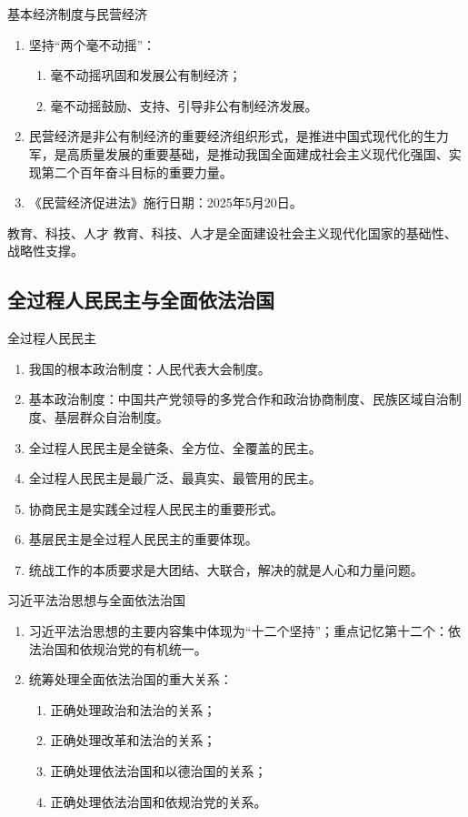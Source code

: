 \documentclass[12pt,a4paper]{ctexart}
\begin{document}
\begin{yellowbox}{基本经济制度与民营经济}
\begin{enumerate}
  \item 坚持“两个毫不动摇”：
  \begin{enumerate}
    \item 毫不动摇巩固和发展公有制经济；
    \item 毫不动摇鼓励、支持、引导非公有制经济发展。
  \end{enumerate}
  \item 民营经济是非公有制经济的重要经济组织形式，是推进中国式现代化的生力军，是高质量发展的重要基础，是推动我国全面建成社会主义现代化强国、实现第二个百年奋斗目标的重要力量。
  \item 《民营经济促进法》施行日期：2025年5月20日。
\end{enumerate}
\end{yellowbox}

\begin{yellowbox}{教育、科技、人才}
教育、科技、人才是全面建设社会主义现代化国家的基础性、战略性支撑。
\end{yellowbox}

\subsection{全过程人民民主与全面依法治国}

\begin{yellowbox}{全过程人民民主}
\begin{enumerate}
  \item 我国的根本政治制度：人民代表大会制度。
  \item 基本政治制度：中国共产党领导的多党合作和政治协商制度、民族区域自治制度、基层群众自治制度。
  \item 全过程人民民主是全链条、全方位、全覆盖的民主。
  \item 全过程人民民主是最广泛、最真实、最管用的民主。
  \item 协商民主是实践全过程人民民主的重要形式。
  \item 基层民主是全过程人民民主的重要体现。
  \item 统战工作的本质要求是大团结、大联合，解决的就是人心和力量问题。
\end{enumerate}
\end{yellowbox}

\begin{yellowbox}{习近平法治思想与全面依法治国}
\begin{enumerate}
  \item 习近平法治思想的主要内容集中体现为“十二个坚持”；重点记忆第十二个：依法治国和依规治党的有机统一。
  \item 统筹处理全面依法治国的重大关系：
  \begin{enumerate}
    \item 正确处理政治和法治的关系；
    \item 正确处理改革和法治的关系；
    \item 正确处理依法治国和以德治国的关系；
    \item 正确处理依法治国和依规治党的关系。
  \end{enumerate}
\end{enumerate}
\end{yellowbox}
\end{document}

